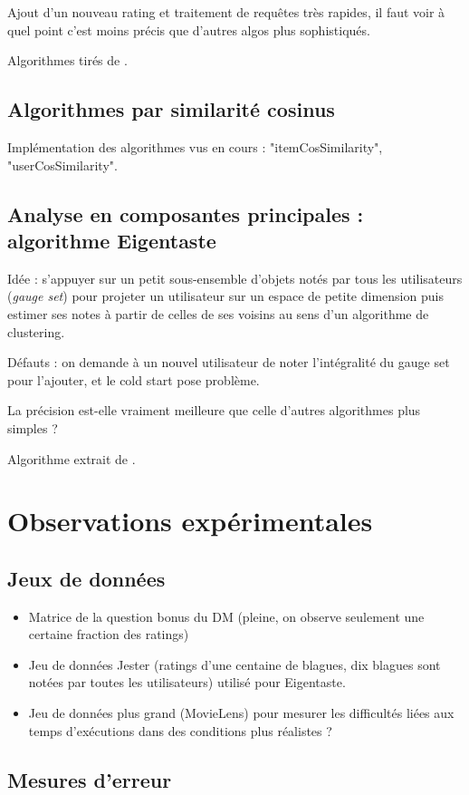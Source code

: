 \documentclass[11pt, openany, a4paper]{article}
\begin{document}
		Ajout d'un nouveau rating et traitement de requêtes très rapides, il faut voir à quel point c'est moins précis que d'autres algos plus sophistiqués.
		
		Algorithmes tirés de \cite{Lemire2007}.
	\subsection{Algorithmes par similarité cosinus}
		Implémentation des algorithmes vus en cours : "itemCosSimilarity", "userCosSimilarity".
		
	\subsection{Analyse en composantes principales : algorithme Eigentaste}
		Idée : s'appuyer sur un petit sous-ensemble d'objets notés par tous les utilisateurs (\emph{gauge set}) pour projeter un utilisateur sur un espace de petite dimension puis estimer ses notes à partir de celles de ses voisins au sens d'un algorithme de clustering.
		
		Défauts : on demande à un nouvel utilisateur de noter l'intégralité du gauge set pour l'ajouter, et le cold start pose problème.
		
		La précision est-elle vraiment meilleure que celle d'autres algorithmes plus simples ?
		
		Algorithme extrait de \cite{Goldberg2001}.
		
		
\section{Observations expérimentales}
	\subsection{Jeux de données}
		\begin{itemize}
			\item{Matrice de la question bonus du DM (pleine, on observe seulement une certaine fraction des ratings)}
			\item{Jeu de données Jester (ratings d'une centaine de blagues, dix blagues sont notées par toutes les utilisateurs) utilisé pour Eigentaste.}
			\item{Jeu de données plus grand (MovieLens) pour mesurer les difficultés liées aux temps d'exécutions dans des conditions plus réalistes ?}
		\end{itemize}
	\subsection{Mesures d'erreur}
	
\end{document}
